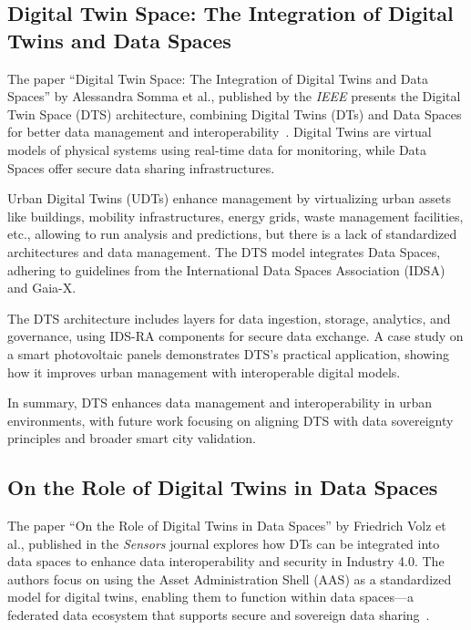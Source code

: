 \subsection{Digital Twin Space: The Integration of Digital Twins and Data Spaces}\label{subsec:digital-twin-space:-the-integration-of-digital-twins-and-data-spaces}

The paper ``Digital Twin Space: The Integration of Digital Twins and Data Spaces'' by Alessandra Somma et al., published by the \textit{IEEE} presents the Digital Twin Space (DTS) architecture, combining Digital Twins (DTs) and Data Spaces for better data management and interoperability~\cite{digital_twins_and_data_spaces}.
Digital Twins are virtual models of physical systems using real-time data for monitoring, while Data Spaces offer secure data sharing infrastructures.

Urban Digital Twins (UDTs) enhance management by virtualizing urban assets like buildings, mobility infrastructures, energy grids, waste management facilities, etc., allowing to run analysis and predictions, but there is a lack of standardized architectures and data management.
The DTS model integrates Data Spaces, adhering to guidelines from the International Data Spaces Association (IDSA) and Gaia-X.

The DTS architecture includes layers for data ingestion, storage, analytics, and governance, using IDS-RA components for secure data exchange.
A case study on a smart photovoltaic panels demonstrates DTS's practical application, showing how it improves urban management with interoperable digital models.

In summary, DTS enhances data management and interoperability in urban environments, with future work focusing on aligning DTS with data sovereignty principles and broader smart city validation.

\subsection{On the Role of Digital Twins in Data Spaces}\label{subsec:on-the-role-of-digital-twins-in-data-spaces}

The paper ``On the Role of Digital Twins in Data Spaces'' by Friedrich Volz et al., published in the \textit{Sensors} journal explores how DTs can be integrated into data spaces to enhance data interoperability and security in Industry 4.0. The authors focus on using the Asset Administration Shell (AAS) as a standardized model for digital twins, enabling them to function within data spaces—a federated data ecosystem that supports secure and sovereign data sharing~\cite{role_of_digital_twins_in_data_spaces}.

